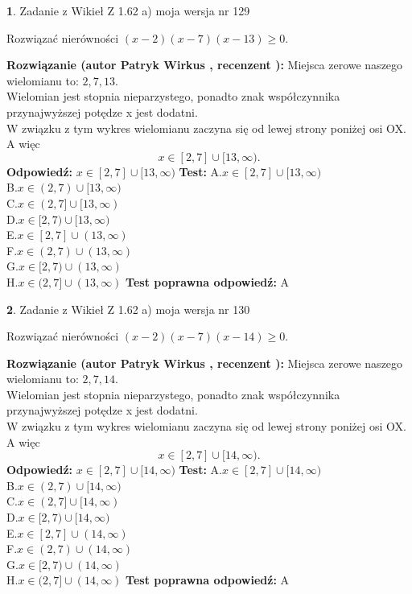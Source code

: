 \documentclass[12pt, a4paper]{article}
\theoremstyle{definition} %
\newtheorem{zad}{}
\newcommand{\zadStart}[1]{\begin{zad}#1\newline}
\newcommand{\zadStop}{\end{zad}}
\newcommand{\rozwStart}[2]{\noindent \textbf{Rozwiązanie (autor #1 , recenzent #2): }\newline}
\newcommand{\rozwStop}{\newline}
\newcommand{\odpStart}{\noindent \textbf{Odpowiedź:}\newline}
\newcommand{\odpStop}{\newline}
\newcommand{\testStart}{\noindent \textbf{Test:}\newline}
\newcommand{\testStop}{\newline}
\newcommand{\kluczStart}{\noindent \textbf{Test poprawna odpowiedź:}\newline}
\newcommand{\kluczStop}{\newline}
\begin{document}
\zadStart{Zadanie z Wikieł Z 1.62 a) moja wersja nr 129}

Rozwiązać nierówności $(x-2)(x-7)(x-13)\ge0$.
\zadStop
\rozwStart{Patryk Wirkus}{}
Miejsca zerowe naszego wielomianu to: $2, 7, 13$.\\
Wielomian jest stopnia nieparzystego, ponadto znak współczynnika przy\linebreak najwyższej potędze x jest dodatni.\\ W związku z tym wykres wielomianu zaczyna się od lewej strony poniżej osi OX. A więc $$x \in [2,7] \cup [13,\infty).$$
\rozwStop
\odpStart
$x \in [2,7] \cup [13,\infty)$
\odpStop
\testStart
A.$x \in [2,7] \cup [13,\infty)$\\
B.$x \in (2,7) \cup [13,\infty)$\\
C.$x \in (2,7] \cup [13,\infty)$\\
D.$x \in [2,7) \cup [13,\infty)$\\
E.$x \in [2,7] \cup (13,\infty)$\\
F.$x \in (2,7) \cup (13,\infty)$\\
G.$x \in [2,7) \cup (13,\infty)$\\
H.$x \in (2,7] \cup (13,\infty)$
\testStop
\kluczStart
A
\kluczStop



\zadStart{Zadanie z Wikieł Z 1.62 a) moja wersja nr 130}

Rozwiązać nierówności $(x-2)(x-7)(x-14)\ge0$.
\zadStop
\rozwStart{Patryk Wirkus}{}
Miejsca zerowe naszego wielomianu to: $2, 7, 14$.\\
Wielomian jest stopnia nieparzystego, ponadto znak współczynnika przy\linebreak najwyższej potędze x jest dodatni.\\ W związku z tym wykres wielomianu zaczyna się od lewej strony poniżej osi OX. A więc $$x \in [2,7] \cup [14,\infty).$$
\rozwStop
\odpStart
$x \in [2,7] \cup [14,\infty)$
\odpStop
\testStart
A.$x \in [2,7] \cup [14,\infty)$\\
B.$x \in (2,7) \cup [14,\infty)$\\
C.$x \in (2,7] \cup [14,\infty)$\\
D.$x \in [2,7) \cup [14,\infty)$\\
E.$x \in [2,7] \cup (14,\infty)$\\
F.$x \in (2,7) \cup (14,\infty)$\\
G.$x \in [2,7) \cup (14,\infty)$\\
H.$x \in (2,7] \cup (14,\infty)$
\testStop
\kluczStart
A
\kluczStop
\end{document}
